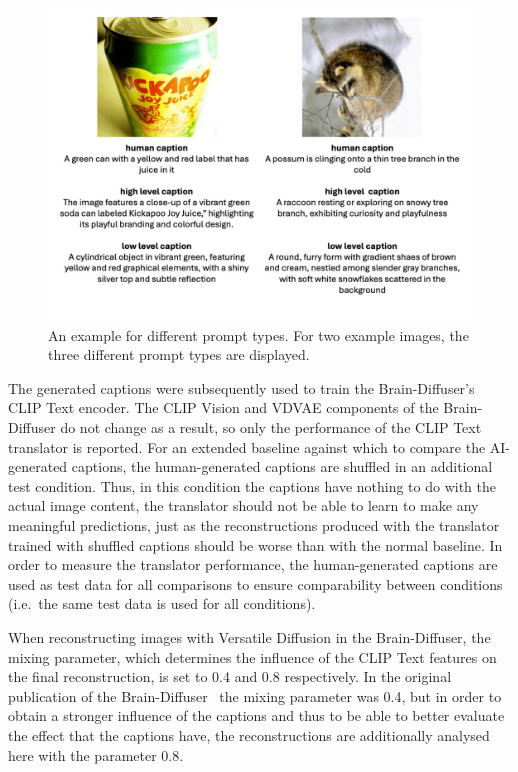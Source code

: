 \begin{figure}[ht]
    \centering
    \includegraphics[width=1\textwidth]{plots/aicap_samples.jpeg}
    \caption[Example for different image captions]{An example for different prompt types. For two example images, the three different prompt types are displayed. }\label{fig:aicap_caption_samples}
\end{figure}

The generated captions were subsequently used to train the Brain-Diffuser's CLIP Text encoder. The CLIP Vision and VDVAE components of the Brain-Diffuser do not change as a result, so only the performance of the CLIP Text translator is reported. For an extended baseline against which to compare the AI-generated captions, the human-generated captions are shuffled in an additional test condition. Thus, in this condition the captions have nothing to do with the actual image content, the translator should not be able to learn to make any meaningful predictions, just as the reconstructions produced with the translator trained with shuffled captions should be worse than with the normal baseline. In order to measure the translator performance, the human-generated captions are used as test data for all comparisons to ensure comparability between conditions (i.e.\ the same test data is used for all conditions). 

When reconstructing images with Versatile Diffusion in the Brain-Diffuser, the mixing parameter, which determines the influence of the CLIP Text features on the final reconstruction, is set to 0.4 and 0.8 respectively. In the original publication of the Brain-Diffuser~\cite{ozcelikNaturalSceneReconstruction2023} the mixing parameter was 0.4, but in order to obtain a stronger influence of the captions and thus to be able to better evaluate the effect that the captions have, the reconstructions are additionally analysed here with the parameter 0.8.


